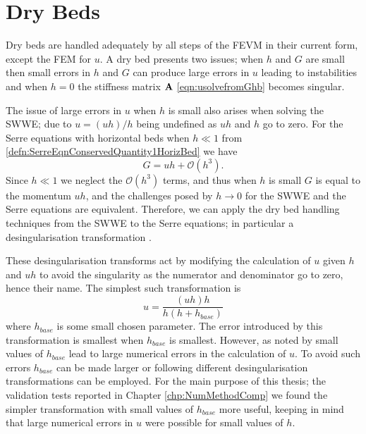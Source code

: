 \section{Dry Beds}
Dry beds are handled adequately by all steps of the FEVM in their current form, except the FEM for $u$. A dry bed presents two issues; when $h$ and $G$ are small then small errors in $h$ and $G$ can produce large errors in $u$ leading to instabilities and when $h=0$ the stiffness matrix $\mathbf{A}$ \eqref{eqn:usolvefromGhb} becomes singular.

The issue of large errors in $u$ when $h$ is small also arises when solving the SWWE; due to $u = (uh)/h $ being undefined as $u h $ and $h$ go to zero. For the Serre equations with horizontal beds when $h \ll 1$ from \eqref{defn:SerreEqnConservedQuantity1HorizBed} we have
\begin{equation}
G = uh + \mathcal{O}\left(h^3\right).
\end{equation}
Since $h \ll 1$ we neglect the $\mathcal{O}\left(h^3\right)$ terms, and thus when $h$ is small $G$ is equal to the momentum $uh$, and the challenges posed by $h \rightarrow 0$ for the SWWE and the Serre equations are equivalent. Therefore, we can apply the dry bed handling techniques from the SWWE to the Serre equations; in particular a desingularisation transformation \cite{Kurganov-Petrova-2007-707}. 

These desingularisation transforms act by modifying the calculation of $u$ given $h$ and $uh$ to avoid the singularity as the numerator and denominator go to zero, hence their name. The simplest such transformation is
\begin{equation}
u = \frac{(uh) h}{h\left(h + h_{base}\right)}
\label{eqn:calculationofugivenuhandh}
\end{equation}
where $h_{base}$ is some small chosen parameter. The error introduced by this transformation is smallest when $h_{base}$ is smallest. However, as noted by \citet{Kurganov-Petrova-2007-707} small values of $h_{base}$ lead to large numerical errors in the calculation of $u$. To avoid such errors $h_{base}$ can be made larger or following \citet{Kurganov-Petrova-2007-707} different desingularisation transformations can be employed. For the main purpose of this thesis; the validation tests reported in Chapter \ref{chp:NumMethodComp} we found the simpler transformation with small values of $h_{base}$ more useful, keeping in mind that large numerical errors in $u$ were possible for small values of $h$. 

